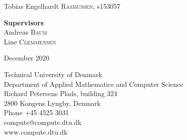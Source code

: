 \begin{titlepage}
\begin{center}
\large Tobias Engelhardt \textsc{Rasmussen}, s153057 %
\end{center}
\begin{center}
\large \textbf{Supervisors} \\
\large Andreas \textsc{Baum} \\
\large Line \textsc{Clemmensen}\\[5cm]
\end{center}





{\large December 2020}\\[3cm] %


 

\vfill %

\end{titlepage}

\thispagestyle{empty}
\vspace*{\fill}

\noindent Technical University of Denmark \\
Department of Applied Mathematics and Computer Science \\
Richard Petersens Plads, building 324 \\
2800 Kongens Lyngby, Denmark \\
Phone +45 4525 3031 \\
compute@compute.dtu.dk \\ 
www.compute.dtu.dk \\